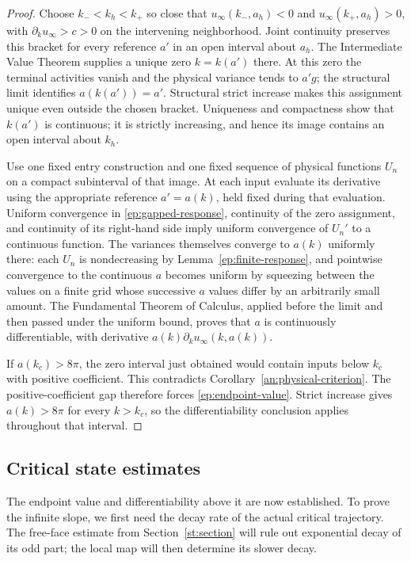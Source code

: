 \begin{proof}
Choose $k_-<k_h<k_+$ so close that $u_\infty(k_-,a_h)<0$
and $u_\infty(k_+,a_h)>0$, with
$\partial_k u_\infty>c>0$ on the intervening neighborhood.
Joint continuity preserves this bracket for every reference
$a'$ in an open interval about $a_h$.  The Intermediate Value Theorem supplies a unique zero $k=k(a')$ there.
At this zero the terminal activities vanish and the physical
variance tends to $a'g$; the structural limit identifies
$a(k(a'))=a'$.  Structural strict increase makes this
assignment unique even outside the chosen bracket.
Uniqueness and compactness show that $k(a')$ is continuous;
it is strictly increasing, and hence its image contains an
open interval about $k_h$.

Use one fixed entry construction and one fixed sequence of
physical functions $U_n$ on a compact subinterval of that
image.  At each input evaluate its derivative using the
appropriate reference $a'=a(k)$, held fixed during that
evaluation.  Uniform convergence in
\eqref{ep:gapped-response}, continuity of the zero assignment,
and continuity of its right-hand side imply uniform
convergence of $U_n'$ to a continuous function.  The
variances themselves converge to $a(k)$ uniformly there:
each $U_n$ is nondecreasing by Lemma~\ref{ep:finite-response},
and pointwise convergence to the continuous $a$ becomes uniform
by squeezing between the values on a finite grid whose successive
$a$ values differ by an arbitrarily small amount.
The Fundamental Theorem of Calculus, applied before the
limit and then passed under the uniform bound, proves that
$a$ is continuously differentiable, with derivative
$a(k)\partial_k u_\infty(k,a(k))$.

If $a(k_c)>8\pi$, the zero interval just obtained would
contain inputs below $k_c$ with positive coefficient.
This contradicts Corollary~\ref{an:physical-criterion}.
The positive-coefficient gap therefore forces
\eqref{ep:endpoint-value}.  Strict increase gives
$a(k)>8\pi$ for every $k>k_c$, so the differentiability
conclusion applies throughout that interval.
\end{proof}

\subsection{Critical state estimates}

The endpoint value and differentiability above it are now established.
To prove the infinite slope, we first need the decay rate of the actual
critical trajectory.  The free-face estimate from
Section~\ref{st:section} will rule out exponential decay of its odd
part; the local map will then determine its slower decay.

